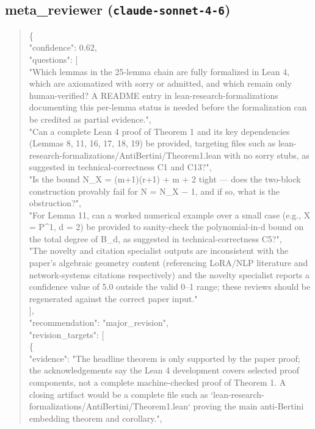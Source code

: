 \documentclass[11pt]{article}
\begin{document}
\subsection*{meta\_reviewer (\texttt{claude-sonnet-4-6})}
\begin{quote}\small\ttfamily\raggedright
\{\\
  "confidence": 0.62,\\
  "questions": [\\
    "Which lemmas in the 25-lemma chain are fully formalized in Lean 4, which are axiomatized with sorry or admitted, and which remain only human-verified? A README entry in lean-research-formalizations documenting this per-lemma status is needed before the formalization can be credited as partial evidence.",\\
    "Can a complete Lean 4 proof of Theorem 1 and its key dependencies (Lemmas 8, 11, 16, 17, 18, 19) be provided, targeting files such as lean-research-formalizations/AntiBertini/Theorem1.lean with no sorry stubs, as suggested in technical-correctness C1 and C13?",\\
    "Is the bound N\_X = (m+1)(r+1) + m + 2 tight --- does the two-block construction provably fail for N = N\_X \ensuremath{-} 1, and if so, what is the obstruction?",\\
    "For Lemma 11, can a worked numerical example over a small case (e.g., X = P\^{}1, d = 2) be provided to sanity-check the polynomial-in-d bound on the total degree of B\_d, as suggested in technical-correctness C5?",\\
    "The novelty and citation specialist outputs are inconsistent with the paper's algebraic geometry content (referencing LoRA/NLP literature and network-systems citations respectively) and the novelty specialist reports a confidence value of 5.0 outside the valid 0--1 range; these reviews should be regenerated against the correct paper input."\\
  ],\\
  "recommendation": "major\_revision",\\
  "revision\_targets": [\\
    \{\\
      "evidence": "The headline theorem is only supported by the paper proof; the acknowledgements say the Lean 4 development covers selected proof components, not a complete machine-checked proof of Theorem 1. A closing artifact would be a complete file such as `lean-research-formalizations/AntiBertini/Theorem1.lean` proving the main anti-Bertini embedding theorem and corollary.",\\

\end{quote}
\end{document}
